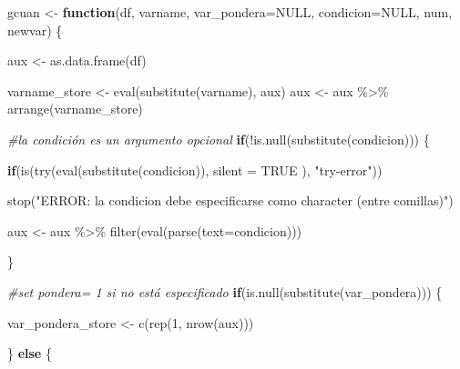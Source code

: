 \documentclass[
]{book}
\newenvironment{Shaded}{\begin{snugshade}}{\end{snugshade}}
\newcommand{\AttributeTok}[1]{\textcolor[rgb]{0.77,0.63,0.00}{#1}}
\newcommand{\CommentTok}[1]{\textcolor[rgb]{0.56,0.35,0.01}{\textit{#1}}}
\newcommand{\ConstantTok}[1]{\textcolor[rgb]{0.00,0.00,0.00}{#1}}
\newcommand{\ControlFlowTok}[1]{\textcolor[rgb]{0.13,0.29,0.53}{\textbf{#1}}}
\newcommand{\DecValTok}[1]{\textcolor[rgb]{0.00,0.00,0.81}{#1}}
\newcommand{\FunctionTok}[1]{\textcolor[rgb]{0.00,0.00,0.00}{#1}}
\newcommand{\NormalTok}[1]{#1}
\newcommand{\OtherTok}[1]{\textcolor[rgb]{0.56,0.35,0.01}{#1}}
\newcommand{\SpecialCharTok}[1]{\textcolor[rgb]{0.00,0.00,0.00}{#1}}
\newcommand{\StringTok}[1]{\textcolor[rgb]{0.31,0.60,0.02}{#1}}
\begin{document}
\begin{Shaded}
\begin{Highlighting}[numbers=left,,]
\NormalTok{gcuan }\OtherTok{\textless{}{-}} \ControlFlowTok{function}\NormalTok{(df, varname, }\AttributeTok{var\_pondera=}\ConstantTok{NULL}\NormalTok{, }\AttributeTok{condicion=}\ConstantTok{NULL}\NormalTok{, num, newvar) \{}
  
\NormalTok{  aux }\OtherTok{\textless{}{-}} \FunctionTok{as.data.frame}\NormalTok{(df) }
  
\NormalTok{  varname\_store }\OtherTok{\textless{}{-}} \FunctionTok{eval}\NormalTok{(}\FunctionTok{substitute}\NormalTok{(varname), aux) }
\NormalTok{  aux }\OtherTok{\textless{}{-}}\NormalTok{ aux }\SpecialCharTok{\%\textgreater{}\%} \FunctionTok{arrange}\NormalTok{(varname\_store)}
  
  
  \CommentTok{\#la condición es un argumento opcional}
  \ControlFlowTok{if}\NormalTok{(}\SpecialCharTok{!}\FunctionTok{is.null}\NormalTok{(}\FunctionTok{substitute}\NormalTok{(condicion))) \{}
      
     \ControlFlowTok{if}\NormalTok{(}\FunctionTok{is}\NormalTok{(}\FunctionTok{try}\NormalTok{(}\FunctionTok{eval}\NormalTok{(}\FunctionTok{substitute}\NormalTok{(condicion)), }\AttributeTok{silent =} \ConstantTok{TRUE}\NormalTok{ ), }\StringTok{"try{-}error"}\NormalTok{))}
        
        \FunctionTok{stop}\NormalTok{(}\StringTok{"ERROR: la condicion debe especificarse como character (entre comillas)"}\NormalTok{)}
      
\NormalTok{        aux }\OtherTok{\textless{}{-}}\NormalTok{ aux }\SpecialCharTok{\%\textgreater{}\%} \FunctionTok{filter}\NormalTok{(}\FunctionTok{eval}\NormalTok{(}\FunctionTok{parse}\NormalTok{(}\AttributeTok{text=}\NormalTok{condicion)))     }
                                                              
\NormalTok{   \}}
  
  
  \CommentTok{\#set pondera= 1 si no está especificado}
  \ControlFlowTok{if}\NormalTok{(}\FunctionTok{is.null}\NormalTok{(}\FunctionTok{substitute}\NormalTok{(var\_pondera))) \{                           }
    
\NormalTok{    var\_pondera\_store }\OtherTok{\textless{}{-}} \FunctionTok{c}\NormalTok{(}\FunctionTok{rep}\NormalTok{(}\DecValTok{1}\NormalTok{, }\FunctionTok{nrow}\NormalTok{(aux)))}
    
\NormalTok{    \} }\ControlFlowTok{else}\NormalTok{ \{}
    

\end{Highlighting}
\end{Shaded}
\end{document}
